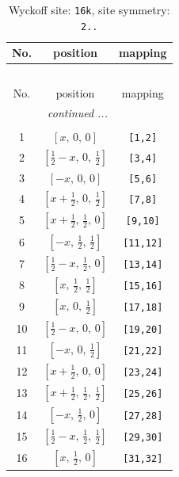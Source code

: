 \documentclass[fleqn,8pt]{jsarticle}
\begin{document}
\renewcommand{\arraystretch}{1.2}
\begin{longtable}{ccc}
\caption{Wyckoff site: {\tt 16k}, site symmetry: {\tt 2..}}
 \\
 \hline \hline
No. & position & mapping \\ \hline \endfirsthead

\multicolumn{2}{l}{\tablename\ \thetable{}} \\
 \hline \hline
No. & position & mapping \\ \hline \endhead

 \hline \hline
\multicolumn{2}{r}{\footnotesize\it continued ...} \\ \endfoot

 \hline \hline
\multicolumn{2}{r}{} \\ \endlastfoot

1 & $\left[ x,\, 0,\, 0 \right]$ & {\tt [1,2]} \\ \hline
2 & $\left[ \frac{1}{2} - x,\, 0,\, \frac{1}{2} \right]$ & {\tt [3,4]} \\ \hline
3 & $\left[ - x,\, 0,\, 0 \right]$ & {\tt [5,6]} \\ \hline
4 & $\left[ x + \frac{1}{2},\, 0,\, \frac{1}{2} \right]$ & {\tt [7,8]} \\ \hline
5 & $\left[ x + \frac{1}{2},\, \frac{1}{2},\, 0 \right]$ & {\tt [9,10]} \\ \hline
6 & $\left[ - x,\, \frac{1}{2},\, \frac{1}{2} \right]$ & {\tt [11,12]} \\ \hline
7 & $\left[ \frac{1}{2} - x,\, \frac{1}{2},\, 0 \right]$ & {\tt [13,14]} \\ \hline
8 & $\left[ x,\, \frac{1}{2},\, \frac{1}{2} \right]$ & {\tt [15,16]} \\ \hline
9 & $\left[ x,\, 0,\, \frac{1}{2} \right]$ & {\tt [17,18]} \\ \hline
10 & $\left[ \frac{1}{2} - x,\, 0,\, 0 \right]$ & {\tt [19,20]} \\ \hline
11 & $\left[ - x,\, 0,\, \frac{1}{2} \right]$ & {\tt [21,22]} \\ \hline
12 & $\left[ x + \frac{1}{2},\, 0,\, 0 \right]$ & {\tt [23,24]} \\ \hline
13 & $\left[ x + \frac{1}{2},\, \frac{1}{2},\, \frac{1}{2} \right]$ & {\tt [25,26]} \\ \hline
14 & $\left[ - x,\, \frac{1}{2},\, 0 \right]$ & {\tt [27,28]} \\ \hline
15 & $\left[ \frac{1}{2} - x,\, \frac{1}{2},\, \frac{1}{2} \right]$ & {\tt [29,30]} \\ \hline
16 & $\left[ x,\, \frac{1}{2},\, 0 \right]$ & {\tt [31,32]} \\
\end{longtable}
\end{document}
